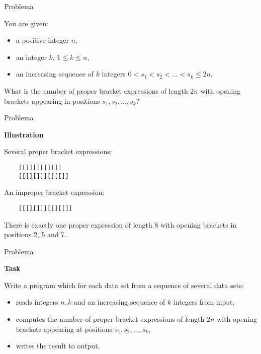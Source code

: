 
\begin{frame}[fragile]{Problema}

You are given:

\begin{itemize}
    \item a positive integer $n$,
    \item an integer $k$, $1\leq k\leq n$,
    \item an increasing sequence of $k$ integers $0 < s_1 < s_2 < \ldots < s_k \leq 2n$.
\end{itemize}

What is the number of proper bracket expressions of length $2n$ with opening brackets appearing in
positions $s_1, s_2, \ldots,s_k$?

\end{frame}

\begin{frame}[fragile]{Problema}

\textbf{Illustration}

    Several proper bracket expressions:
        \begin{verbatim}
    [[]][[[]][]] 
    [[[][]]][][[]]
        \end{verbatim}
An improper bracket expression:

        \begin{verbatim}
    [[[][]]][]][[]]
        \end{verbatim}
There is exactly one proper expression of length 8 with opening brackets in positions 2, 5 and 7.

\end{frame}

\begin{frame}[fragile]{Problema}

\textbf{Task}

    Write a program which for each data set from a sequence of several data sets:

    \begin{itemize}
        \item reads integers $n, k$ and an increasing sequence of $k$ integers from input,
        \item computes the number of proper bracket expressions of length $2n$ with opening
            brackets appearing at positions $s_1, s_2, \ldots, s_k$,
        \item writes the result to output.
    \end{itemize}

\end{frame}

